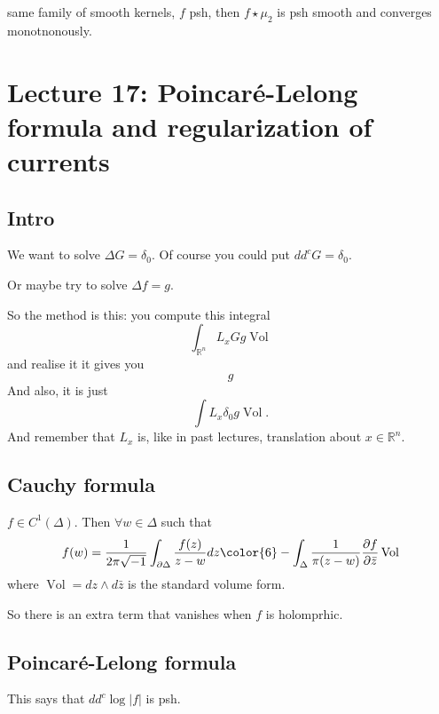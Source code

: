 \begin{claim}\leavevmode
same family of smooth kernels, \(f\) psh, then \(f \star \mu_2\) is psh smooth and converges monotnonously.
\end{claim}

\section{Lecture 17: Poincaré-Lelong formula and regularization of currents}

\subsection{Intro}

We want to solve \(\Delta G=\delta_0\). Of course you could put \(dd^cG=\delta_0\).

Or maybe try to solve \(\Delta f =g\).

So the method is this: you compute this integral
\[\int_{\mathbb{R}^n}L_xGg\operatorname{Vol}\]
and realise it it gives you 
\[g\]
And also, it is just
\[\int L_x \delta_0 g \operatorname{Vol}.\]
And remember that \(L_x\) is, like in past lectures, translation about \(x \in \mathbb{R}^n\).

\subsection{Cauchy formula}



\begin{thm}\leavevmode
\(f \in C^1(\Delta)\). Then \(\forall w \in \Delta\) such that
\[f(w)=\frac{1}{2\pi \sqrt{-1}}\int_{\partial  \Delta}\frac{f(z)}{z-w}dz{\color{6}-\int_\Delta \frac{ 1}{\pi(z-w)}\frac{\partial  f}{\partial  \bar{z}}\operatorname{Vol}}\]
where \(\operatorname{Vol}=dz \wedge d\bar{z}\) is the standard volume form.
\end{thm}

So there is an extra term that vanishes when \(f\) is holomprhic.

\subsection{Poincaré-Lelong formula}

\begin{upshot}\leavevmode
This says that \(dd^c \operatorname{log}|f|\) is psh.
\end{upshot}

